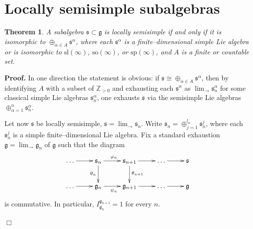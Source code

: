 \documentclass[oneside,leqno,12pt]{article}
\newcounter{theorem}
\newtheorem{theo}{Theorem}[section]
\newenvironment{proof}{ \noindent \textbf{Proof.}}{\hfill $\Box$}
\def\gg{\mathfrak{g}}
\def\Z{\mathbb{Z}}
\renewcommand{\ss}{\mathfrak{s}}
\renewcommand{\gg}{\mathfrak{g}}
\renewcommand {\phi} {\varphi}
\renewcommand{\sp}{\mathrm{sp}}
\renewcommand{\sl}{\mathrm{sl}}
\newcommand{\so}{\mathrm{so}}
\begin{document}
\section{Locally semisimple subalgebras}
\begin{theo}\label{th1}
A subalgebra $\ss\subset\gg$ is locally semisimple if and only if it is isomorphic to $\oplus_{\alpha\in A}\ss^\alpha$, where each $\ss^\alpha$ is a 
finite--dimensional simple Lie algebra or is isomorphic to $\sl(\infty)$, $\so(\infty)$, or $\sp(\infty)$, and $A$ is a finite or countable set.
\end{theo}
\begin{proof}
In one direction the statement is obvious: if $\ss\cong\oplus_{\alpha\in A}\ss^\alpha$, then by identifying $A$ with a subset of $\Z_{>0}$ and exhausting each $\ss^\alpha$ as $\displaystyle\lim_\to \ss_n^\alpha$ for some classical simple  Lie algebras $\ss_n^\alpha$, one exhausts $\ss$ via the semisimple Lie algebras $\oplus_{\alpha=1}^n\ss_n^\alpha$. 

Let now $\ss$ be locally semisimple, $\displaystyle\ss=\lim_\to\ss_n$. Write $\ss_n=\oplus_{j=1}^{l_n}\ss_n^j$, where each $\ss_n^j$ is a simple 
finite--dimensional Lie algebra. Fix a standard exhaustion $\displaystyle\gg=\lim_\to\gg_n$ of $\gg$ such that the diagram 
\begin{equation}\label{eqExhausting1}
\xymatrix{
\dots\ar[r]&\ss_n\ar[d]_{\theta_n}\ar[r]^{\phi_n}&\ss_{n+1}\ar[d]^{\theta_{n+1}}\ar[r]&\dots\ar[r]&\ss\\
\dots\ar[r]&\gg_n\ar[r]_{\psi_n}&\gg_{n+1}\ar[r]&\dots\ar[r]&\gg\\
}
\end{equation}
is commutative. In particular, $I_{\gg_n}^{\gg_{n+1}}=1$ for every $n$.


\end{proof}
\end{document}
